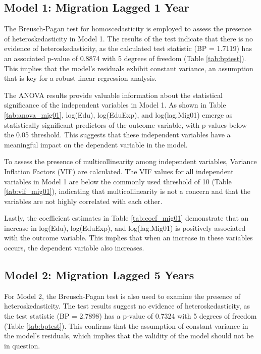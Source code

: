 \documentclass[12pt]{article}
\begin{document}
\subsection{Model 1: Migration Lagged 1 Year} \label{results-model1}

The Breusch-Pagan test for homoscedasticity is employed to assess the presence of heteroskedasticity in Model 1.
The results of the test indicate that there is no evidence of heteroskedasticity, as the calculated test statistic (BP = 1.7119) has an associated p-value of 0.8874 with 5 degrees of freedom (Table \ref{tab:bptest}).
This implies that the model's residuals exhibit constant variance, an assumption that is key for a robust linear regression analysis.

The ANOVA results provide valuable information about the statistical significance of the independent variables in Model 1.
As shown in Table \ref{tab:anova_mig01}, log(Edu), log(EduExp), and log(lag.Mig01) emerge as statistically significant predictors of the outcome variable, with p-values below the 0.05 threshold.
This suggests that these independent variables have a meaningful impact on the dependent variable in the model.

To assess the presence of multicollinearity among independent variables, Variance Inflation Factors (VIF) are calculated.
The VIF values for all independent variables in Model 1 are below the commonly used threshold of 10 (Table \ref{tab:vif_mig01}), indicating that multicollinearity is not a concern and that the variables are not highly correlated with each other.

Lastly, the coefficient estimates in Table \ref{tab:coef_mig01} demonstrate that an increase in log(Edu), log(EduExp), and log(lag.Mig01) is positively associated with the outcome variable. This implies that when an increase in these variables occurs, the dependent variable also increases.

\subsection{Model 2: Migration Lagged 5 Years} \label{results-model2}

For Model 2, the Breusch-Pagan test is also used to examine the presence of heteroskedasticity. The test results suggest no evidence of heteroskedasticity, as the test statistic (BP = 2.7898) has a p-value of 0.7324 with 5 degrees of freedom (Table \ref{tab:bptest}).
This confirms that the assumption of constant variance in the model's residuals, which implies that the validity of the model should not be in question.
\end{document}
